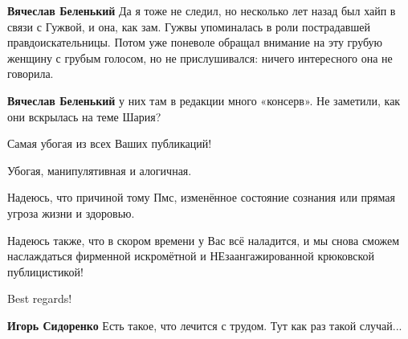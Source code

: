 \begin{itemize}
\begin{itemize}
\textbf{Вячеслав Беленький} Да я тоже не следил, но несколько лет назад был хайп в связи с Гужвой, и она, как зам. Гужвы упоминалась в роли пострадавшей правдоискательницы. Потом уже поневоле обращал внимание на эту грубую женщину с грубым голосом, но не прислушивался: ничего интересного она не говорила.

 
\textbf{Вячеслав Беленький} у них там в редакции много «консерв». Не заметили, как они вскрылась на теме Шария?

\end{itemize}

 

Самая убогая из всех Ваших публикаций!

Убогая, манипулятивная и алогичная.

Надеюсь, что причиной тому Пмс, изменённое состояние сознания или прямая угроза
жизни и здоровью.

Надеюсь также, что в скором времени у Вас всё наладится, и мы снова сможем
наслаждаться фирменной искромётной и НЕзаангажированной крюковской
публицистикой!

Best regards!

\begin{itemize}
 
\textbf{Игорь Сидоренко} Есть такое, что лечится с трудом. Тут как раз такой случай...
\end{itemize}

 


\end{itemize}
